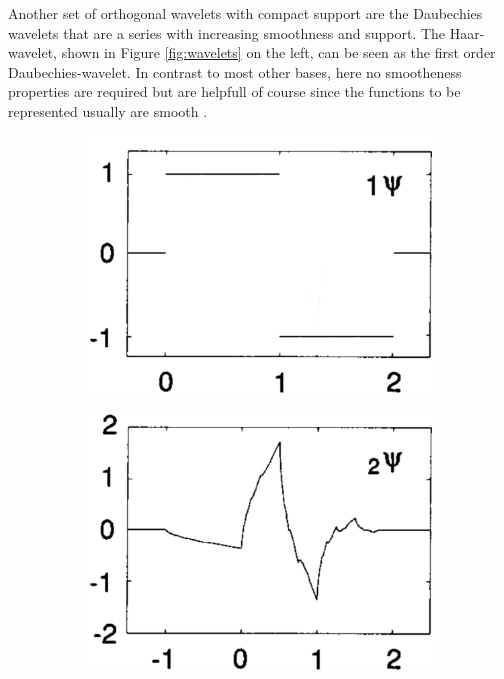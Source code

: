 {Another set of orthogonal wavelets with compact support are the Daubechies wavelets that are a series with increasing smoothness and support.
The Haar-wavelet, shown in Figure \ref{fig:wavelets} on the left, can be seen as the first order Daubechies-wavelet.
In contrast to most other bases, here no smootheness properties are required but are helpfull of course since the functions to be represented usually are smooth \cite{daubechies}.
\begin{figure}
   \begin{subfigure}{0.32\textwidth}
   \includegraphics[width=\textwidth]{Figures/Daubechies1}
   \end{subfigure}
   \begin{subfigure}{0.32\textwidth}
   \includegraphics[width=\textwidth]{Figures/Daubechies2}

\end{subfigure}
\end{figure}}

